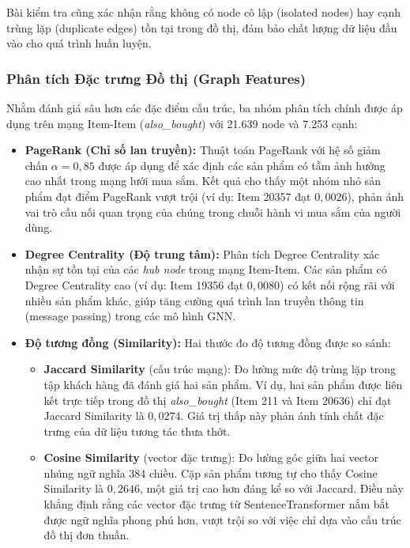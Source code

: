 Bài kiểm tra cũng xác nhận rằng không có node cô lập (isolated nodes) hay cạnh trùng lặp (duplicate edges) tồn tại trong đồ thị, đảm bảo chất lượng dữ liệu đầu vào cho quá trình huấn luyện.

\subsubsection{Phân tích Đặc trưng Đồ thị (Graph Features)}

Nhằm đánh giá sâu hơn các đặc điểm cấu trúc, ba nhóm phân tích chính được áp dụng trên mạng Item-Item (\textit{also\_bought}) với 21.639 node và 7.253 cạnh:

\begin{itemize}
    \item \textbf{PageRank (Chỉ số lan truyền):} Thuật toán PageRank với hệ số giảm chấn $\alpha = 0{,}85$ được áp dụng để xác định các sản phẩm có tầm ảnh hưởng cao nhất trong mạng lưới mua sắm. Kết quả cho thấy một nhóm nhỏ sản phẩm đạt điểm PageRank vượt trội (ví dụ: Item 20357 đạt $0{,}0026$), phản ánh vai trò cầu nối quan trọng của chúng trong chuỗi hành vi mua sắm của người dùng.
    \item \textbf{Degree Centrality (Độ trung tâm):} Phân tích Degree Centrality xác nhận sự tồn tại của các \textit{hub node} trong mạng Item-Item. Các sản phẩm có Degree Centrality cao (ví dụ: Item 19356 đạt $0{,}0080$) có kết nối rộng rãi với nhiều sản phẩm khác, giúp tăng cường quá trình lan truyền thông tin (message passing) trong các mô hình GNN.
    \item \textbf{Độ tương đồng (Similarity):} Hai thước đo độ tương đồng được so sánh:
    \begin{itemize}
        \item \textbf{Jaccard Similarity} (cấu trúc mạng): Đo lường mức độ trùng lặp trong tập khách hàng đã đánh giá hai sản phẩm. Ví dụ, hai sản phẩm được liên kết trực tiếp trong đồ thị \textit{also\_bought} (Item 211 và Item 20636) chỉ đạt Jaccard Similarity là $0{,}0274$. Giá trị thấp này phản ánh tính chất đặc trưng của dữ liệu tương tác thưa thớt.
        \item \textbf{Cosine Similarity} (vector đặc trưng): Đo lường góc giữa hai vector nhúng ngữ nghĩa 384 chiều. Cặp sản phẩm tương tự cho thấy Cosine Similarity là $0{,}2646$, một giá trị cao hơn đáng kể so với Jaccard. Điều này khẳng định rằng các vector đặc trưng từ SentenceTransformer nắm bắt được ngữ nghĩa phong phú hơn, vượt trội so với việc chỉ dựa vào cấu trúc đồ thị đơn thuần.
    \end{itemize}
\end{itemize}

